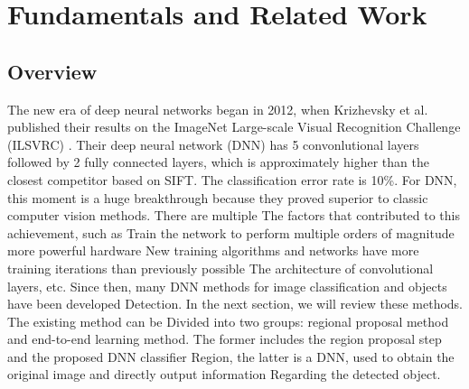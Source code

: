 
\chapter{Fundamentals and Related Work}
\label{sec:fundamentals_related-work}
\section{Overview}
The new era of deep neural networks began in 2012, when Krizhevsky et al. published
their results on the ImageNet Large-scale Visual Recognition Challenge (ILSVRC) 
\cite{krizhevsky_imagenet_2017}. Their deep neural network (DNN) has 5 convonlutional layers followed by 2 fully connected layers, which is approximately higher than the closest competitor based on SIFT\cite{sanchez_high-dimensional_2011}. The classification error rate is 10\%. For DNN, this moment is a huge breakthrough because they proved superior to classic computer vision methods. There are multiple
The factors that contributed to this achievement, such as
Train the network to perform multiple orders of magnitude more powerful hardware
New training algorithms and networks have more training iterations than previously possible
The architecture of convolutional layers, etc.
Since then, many DNN methods for image classification and objects have been developed
Detection. In the next section, we will review these methods. The existing method can be
Divided into two groups: regional proposal method and end-to-end learning method.
The former includes the region proposal step and the proposed DNN classifier
Region, the latter is a DNN, used to obtain the original image and directly output information
Regarding the detected object. 
\subsection{}
